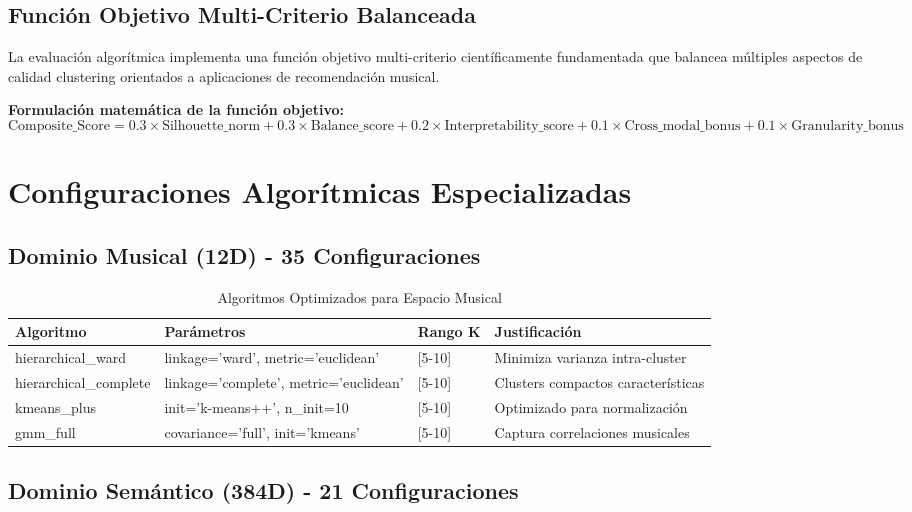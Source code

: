 \documentclass[12pt,a4paper]{report}
\begin{document}
\subsection{Función Objetivo Multi-Criterio Balanceada}

La evaluación algorítmica implementa una función objetivo multi-criterio científicamente fundamentada que balancea múltiples aspectos de calidad clustering orientados a aplicaciones de recomendación musical.

\textbf{Formulación matemática de la función objetivo:}
\begin{equation}
\text{Composite\_Score} = 0.3 \times \text{Silhouette\_norm} + 0.3 \times \text{Balance\_score} + 0.2 \times \text{Interpretability\_score} + 0.1 \times \text{Cross\_modal\_bonus} + 0.1 \times \text{Granularity\_bonus}
\end{equation}

\section{Configuraciones Algorítmicas Especializadas}

\subsection{Dominio Musical (12D) - 35 Configuraciones}

\begin{table}[H]
\centering
\caption{Algoritmos Optimizados para Espacio Musical}
\begin{tabular}{|l|l|l|l|}
\hline
\textbf{Algoritmo} & \textbf{Parámetros} & \textbf{Rango K} & \textbf{Justificación} \\
\hline
hierarchical\_ward & linkage='ward', metric='euclidean' & [5-10] & Minimiza varianza intra-cluster \\
\hline
hierarchical\_complete & linkage='complete', metric='euclidean' & [5-10] & Clusters compactos características \\
\hline
kmeans\_plus & init='k-means++', n\_init=10 & [5-10] & Optimizado para normalización \\
\hline
gmm\_full & covariance='full', init='kmeans' & [5-10] & Captura correlaciones musicales \\
\hline
\end{tabular}
\end{table}

\subsection{Dominio Semántico (384D) - 21 Configuraciones}
\end{document}
